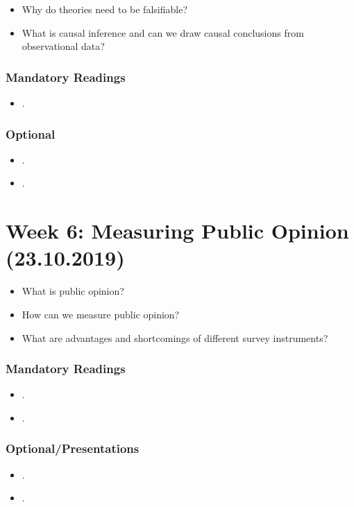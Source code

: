 \documentclass[abstract=on,parskip=full,headings=standardclasses,fontsize=11pt,paper=a4]{scrartcl}
\begin{document}
\begin{itemize}
\item  Why do theories need to be falsifiable?
\item What is causal inference and can we draw causal conclusions from observational data?
\end{itemize}


\subsubsection*{Mandatory Readings}
\begin{itemize}
\item {}.
\end{itemize}


\subsubsection*{Optional}
\begin{itemize}
\item {}.
\item {}.
\end{itemize}





\section{Week 6: Measuring Public Opinion (23.10.2019)}


\begin{itemize}
\renewcommand\labelitemi{--}
\item What is public opinion?
\item How can we measure public opinion? 
\item What are advantages and shortcomings of different survey instruments?
\end{itemize}


\subsubsection*{Mandatory Readings}
\begin{itemize}
\item {}.
\item {}.
\end{itemize}


\subsubsection*{Optional/Presentations}
\begin{itemize}
\item {}.
\item {}.
\end{itemize}
\end{document}
